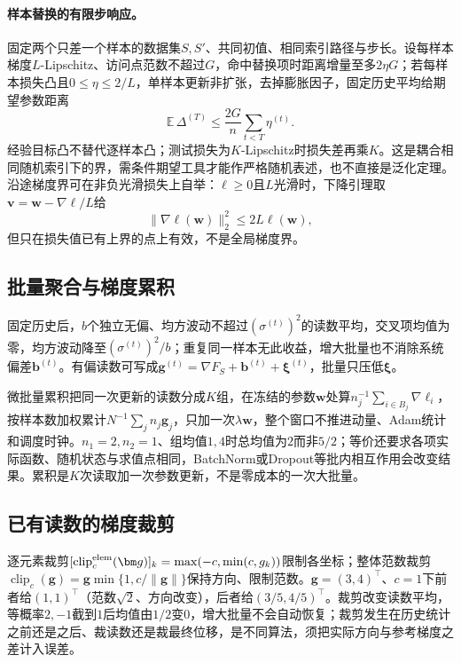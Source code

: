 \paragraph{样本替换的有限步响应。}
固定两个只差一个样本的数据集$S,S'$、共同初值、相同索引路径与步长。设每样本梯度$L$-Lipschitz、访问点范数不超过$G$，命中替换项时距离增量至多$2\eta G$；若每样本损失凸且$0\leq\eta\leq2/L$，单样本更新非扩张，去掉膨胀因子，固定历史平均给期望参数距离
\begin{equation}
 \mathbb E\,\Delta^{(T)}\leq\frac{2G}{n}\sum_{t<T}\eta^{(t)}.
 \label{eq:opt-stability-distance}
\end{equation}
经验目标凸不替代逐样本凸；测试损失为$K$-Lipschitz时损失差再乘$K$。这是耦合相同随机索引下的界，需条件期望工具才能作严格随机表述，也不直接是泛化定理。沿途梯度界可在非负光滑损失上自举：$\ell\geq0$且$L$光滑时，下降引理取$\bm v=\bm w-\nabla\ell/L$给
\begin{equation}
 \|\nabla\ell(\bm w)\|_2^2\leq2L\ell(\bm w),
 \label{eq:opt-self-bounding}
\end{equation}
但只在损失值已有上界的点上有效，不是全局梯度界。

\subsection{批量聚合与梯度累积}

固定历史后，$b$个独立无偏、均方波动不超过$(\sigma^{(t)})^2$的读数平均，交叉项均值为零，均方波动降至$(\sigma^{(t)})^2/b$；重复同一样本无此收益，增大批量也不消除系统偏差$\bm b^{(t)}$。有偏读数可写成$\bm g^{(t)}=\nabla F_S+\bm b^{(t)}+\bm\xi^{(t)}$，批量只压低$\bm\xi$。

微批量累积把同一次更新的读数分成$K$组，在冻结的参数$\bm w$处算$n_j^{-1}\sum_{i\in B_j}\nabla\ell_i$，按样本数加权累计$N^{-1}\sum_jn_j\bm g_j$，只加一次$\lambda\bm w$，整个窗口不推进动量、Adam统计和调度时钟。$n_1=2,n_2=1$、组均值$1,4$时总均值为$2$而非$5/2$；等价还要求各项实际函数、随机状态与求值点相同，BatchNorm或Dropout等批内相互作用会改变结果。累积是$K$次读取加一次参数更新，不是零成本的一次大批量。

\subsection{已有读数的梯度裁剪}

逐元素裁剪$[\operatorname{clip}^{\rm elem}_c(\bm g)]_k=\max(-c,\min(c,g_k))$限制各坐标；整体范数裁剪$\operatorname{clip}_c(\bm g)=\bm g\min\{1,c/\|\bm g\|\}$保持方向、限制范数。$\bm g=(3,4)^\top$、$c=1$下前者给$(1,1)^\top$（范数$\sqrt2$、方向改变），后者给$(3/5,4/5)^\top$。裁剪改变读数平均，等概率$2,-1$截到$1$后均值由$1/2$变$0$，增大批量不会自动恢复；裁剪发生在历史统计之前还是之后、裁读数还是裁最终位移，是不同算法，须把实际方向与参考梯度之差计入误差。

